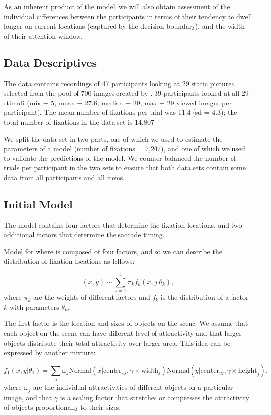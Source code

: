 \documentclass{article}
\begin{document}
As an inherent product of the model, we will also obtain assessment of the individual differences between the participants in terms of their tendency to dwell longer on current locations (captured by the decision boundary), and the width of their attention window.

\subsection{Data Descriptives}

The data contains recordings of 47 participants looking at 29 static pictures selected from the pool of 700 images created by \citet{xu2014beyond}. 39 participants looked at all 29 stimuli (min = 5, mean = 27.6, median = 29, max = 29 viewed images per participant). The mean number of fixations per trial was 11.4 (sd = 4.3); the total number of fixations in the data set is 14,807.

We split the data set in two parts, one of which we used to estimate the parameters of a model (number of fixations = 7,207), and one of which we used to validate the predictions of the model. We counter balanced the number of trials per participant in the two sets to ensure that both data sets contain some data from all participants and all items.  

\subsection{Initial Model}

The model contains four factors that determine the fixation locations, and two additional factors that determine the saccade timing.

Model for where is composed of four factors, and so we can describe the distribution of fixation locations as follows:

\begin{equation}
    (x, y) \sim \sum_{k=1}^4 \pi_k f_k(x, y | \theta_k),
\end{equation}
where $\pi_k$ are the weights of different factors and $f_k$ is the distribution of a factor $k$ with parameters $\theta_k$.

The first factor is the location and sizes of objects on the scene. We assume that each object on the scene can have different level of attractivity and that larger objects distribute their total attractivity over larger area. This idea can be expressed by another mixture:

\begin{equation}
    f_1(x, y | \theta_1) = \sum_j \omega_j \text{Normal}(x | \text{center}_{xj}, \gamma \times \text{width}_{j}) \text{Normal}(y | \text{center}_{yj}, \gamma \times\text{height}_{j}), 
\end{equation}
where $\omega_j$ are the individual attractivities of different objects on a particular image, and that $\gamma$ is a scaling factor that stretches or compresses the attractivity of objects proportionally to their sizes.
\end{document}

